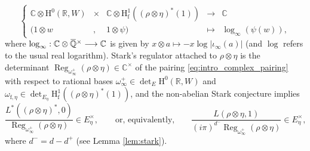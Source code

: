 \documentclass[12pt]{amsart}
\newcommand\bR{\mathbb{R}}
\newcommand\bC{\mathbb{C}}
\newcommand\bQ{\mathbb{Q}}
\newcommand\cO{\mathcal{O}}
\newcommand{\ob}[1]{\mkern 1.5mu\overline{\mkern-1.5mu#1\mkern-1.5mu}\mkern 1.5mu}
\DeclareMathOperator{\Reg}{Reg}
\newcommand{\HH}{\mathrm{H}}
\newcommand{\ff}{\mathrm{f}}
\theoremstyle{defstyle}
\theoremstyle{thmstyle}
\begin{document}
\begin{equation}\label{eq:intro_complex_pairing}
\left\{\begin{array}{rclcc} \bC \otimes \HH^0(\bR,W) & \times& \bC \otimes \HH^1_\ff((\rho\otimes\eta)^*(1)) &\longrightarrow &\bC \\
(1 \otimes w &,&1\otimes \psi) &\mapsto & \log_\infty(\psi(w)),
\end{array}\right.
\end{equation}
 where $\log_\infty : \bC \otimes \ob{\bQ}^\times \longrightarrow \bC$ is given by $ x \otimes a \mapsto -x \log|\iota_\infty(a)|$ (and $\log$ refers to the usual real logarithm). Stark's regulator attached to $\rho \otimes\eta$ is the determinant $\Reg_{\omega_\infty^+}(\rho\otimes\eta)\in \bC^\times$ of the pairing \eqref{eq:intro_complex_pairing} with respect to rational bases $\omega_{\infty}^+\in \det_E \HH^0(\bR,W)$ and $\omega_{\ff,\eta}\in \det_{E_\eta} \HH^1_\ff((\rho\otimes\eta)^*(1))$, and the non-abelian Stark conjecture implies
 \begin{equation}\label{eq:Stark_conj_over_E}
  \dfrac{L^*((\rho\otimes\eta)^*,0)}{\Reg_{\omega_\infty^+}(\rho\otimes\eta)} \in E_\eta^\times, \qquad \textrm{or, equivalently,} \qquad \frac{L(\rho\otimes\eta,1)}{(i\pi)^{d^-}\Reg_{\omega_\infty^+}(\rho\otimes\eta)} \in E_\eta^\times,
 \end{equation}
where $d^-=d-d^+$ (see Lemma \ref{lem:stark}).
\end{document}

